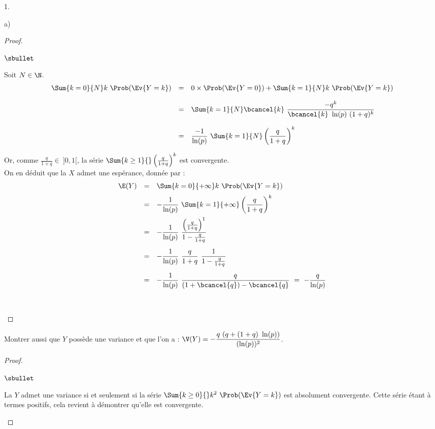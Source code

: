\documentclass[11pt]{article}%
\begin{document}
\begin{noliste}{1.}
\begin{noliste}{a)}
\begin{proof}
\begin{noliste}{$\sbullet$}
      \item Soit $N \in \N$.
        \[
        \begin{array}{rcl}
          \Sum{k = 0}{N} k \ \Prob(\Ev{Y = k}) & = & 0 \times \Prob(\Ev{Y =
            0}) + \Sum{k = 1}{N} k \ \Prob(\Ev{Y = k}) 
          \\[.4cm]
          & = & \Sum{k = 1}{N} \bcancel{k} \ \dfrac{-q^k}{\bcancel{k}
            \ \ln(p) \ (1+q)^k} 
          \\[.6cm]
          & = & \dfrac{-1}{\ln(p)} \ \Sum{k = 1}{N}
          \left(\dfrac{q}{1+q} \right)^k 
        \end{array}
        \]

      \item Or, comme $\frac{q}{1+q} \in \ ]0, 1[$, la série $\Sum{k
          \geq 1}{} \left( \frac{q}{1+q} \right)^k$ est convergente.\\
        On en déduit que la \var $X$ admet une espérance, donnée par :
        \[
        \begin{array}{rcl}
          \E(Y) & = & \Sum{k=0}{+\infty} k \ \Prob(\Ev{Y = k}) 
          \\[.2cm]
          & = & -\dfrac{1}{\ln(p)} \ \Sum{k=1}{+\infty} \left(\dfrac{q}{1+q}
          \right)^k 
          \\[.4cm]
          & = & -\dfrac{1}{\ln(p)} \ \dfrac{\left( \frac{q}{1+q}
            \right)^1}{1 - \frac{q}{1+q}}
          \\[.6cm]
          & = & -\dfrac{1}{\ln(p)} \ \dfrac{q}{1+q} \ \dfrac{1}{1 -
            \frac{q}{1+q}} 
          \\[.6cm]
          & = & -\dfrac{1}{\ln(p)} \ \dfrac{q}{(1 + \bcancel{q}) -
            \bcancel{q}} \ = \ - \dfrac{q}{\ln(p)}
        \end{array}
        \]

        ~\\[-1.4cm]
      \end{noliste}
    \end{proof}

  \item Montrer aussi que $Y$ possède une variance et que l'on a :
    $\V(Y) = -\dfrac{q \ (q + (1 + q) \ \ln(p))}{(\ln(p))^{2}}$.

    \begin{proof}~%
      \begin{noliste}{$\sbullet$}
      \item La \var $Y$ admet une variance si et seulement si la série
        $\Sum{k \geq 0}{} k^2 \ \Prob(\Ev{Y = k})$ est absolument
        convergente. Cette série étant à termes positifs, cela
        revient à démontrer qu'elle est convergente.


\end{noliste}
\end{proof}
\end{noliste}
\end{noliste}
\end{document}
